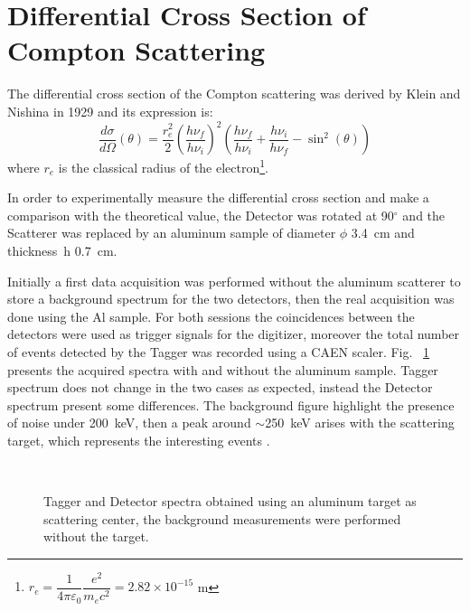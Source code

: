 \newpage
\section*{Differential Cross Section of Compton Scattering}
The differential cross section of the Compton scattering was derived by Klein and Nishina in 1929 and its expression is:
\begin{equation*}
	\frac{d\sigma}{d\Omega}(\theta)=\frac{r_e ^2}{2}\left(\frac{h \nu_f}{h \nu_i}\right)^2\left(\frac{h \nu_f}{h \nu_i}+\frac{h \nu_i}{h \nu_f}-\sin^2(\theta)\right)
\end{equation*}
where $r_e$ is the classical radius of the electron\footnote{$r_e =\dfrac{1}{4\pi \varepsilon_0}\dfrac{e^2}{m_ec^2} =2.82 \times 10^{-15}$ m}.

\medskip

In order to experimentally measure the differential cross section and make a comparison with the theoretical value, the Detector was rotated at 90$^\circ$ and the Scatterer was replaced by an aluminum sample of  diameter $\phi$ 3.4~cm and thickness~h 0.7~cm.  

Initially  a first data acquisition was performed without the aluminum scatterer to store a background spectrum for the two detectors, then the real acquisition was done using the Al sample. For both sessions the coincidences between the detectors were used as trigger signals for the digitizer, moreover the total number of events detected by the Tagger was recorded using a CAEN scaler. Fig.~ \ref{Fig:CrossSection_spectra} presents the acquired spectra with and without the aluminum sample. Tagger spectrum does not change in the two cases as expected, instead the Detector spectrum present some differences. The background figure highlight the presence of noise under 200~keV, then a peak around $\sim$250~keV arises with the scattering target, which represents the interesting events . 

\begin{figure}[h!]
	\centering
	 \quad
	 \quad
	 \quad
	\\
	\caption{Tagger and Detector spectra obtained using an aluminum target as scattering center, the background measurements were performed without the target.}
	\label{Fig:CrossSection_spectra}
\end{figure}
\newpage

